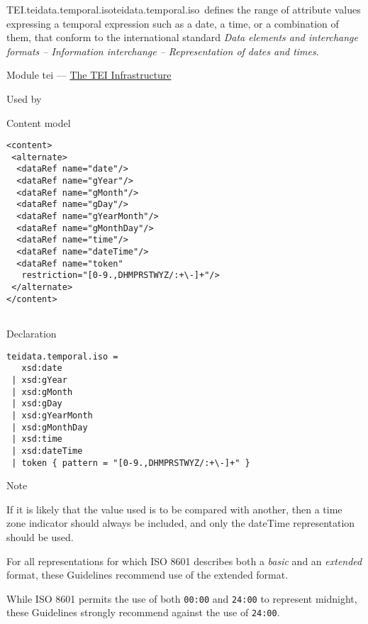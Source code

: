 \begin{reflist}
\item[]\begin{specHead}{TEI.teidata.temporal.iso}{teidata.temporal.iso} defines the range of attribute values expressing a temporal expression such as a date, a time, or a combination of them, that conform to the international standard \textit{Data elements and interchange formats – Information interchange – Representation of dates and times}.\end{specHead} 
    \item[{Module}]
  tei — \hyperref[ST]{The TEI Infrastructure}
    \item[{Used by}]
  
    \item[{Content model}]
  \mbox{}\hfill\\[-10pt]\begin{Verbatim}[fontsize=\small]
<content>
 <alternate>
  <dataRef name="date"/>
  <dataRef name="gYear"/>
  <dataRef name="gMonth"/>
  <dataRef name="gDay"/>
  <dataRef name="gYearMonth"/>
  <dataRef name="gMonthDay"/>
  <dataRef name="time"/>
  <dataRef name="dateTime"/>
  <dataRef name="token"
   restriction="[0-9.,DHMPRSTWYZ/:+\-]+"/>
 </alternate>
</content>
    
\end{Verbatim}

    \item[{Declaration}]
  \mbox{}\hfill\\[-10pt]\begin{Verbatim}[fontsize=\small]
teidata.temporal.iso =
   xsd:date
 | xsd:gYear
 | xsd:gMonth
 | xsd:gDay
 | xsd:gYearMonth
 | xsd:gMonthDay
 | xsd:time
 | xsd:dateTime
 | token { pattern = "[0-9.,DHMPRSTWYZ/:+\-]+" }
\end{Verbatim}

    \item[{Note}]
  \par
If it is likely that the value used is to be compared with another, then a time zone indicator should always be included, and only the dateTime representation should be used.\par
For all representations for which ISO 8601 describes both a \textit{basic} and an \textit{extended} format, these Guidelines recommend use of the extended format.\par
While ISO 8601 permits the use of both \texttt{00:00} and \texttt{24:00} to represent midnight, these Guidelines strongly recommend against the use of \texttt{24:00}. 
\end{reflist}  
